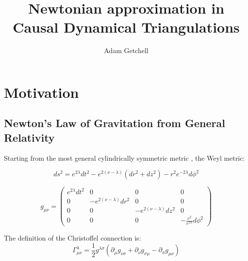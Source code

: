 \documentclass{article}
\title{Newtonian approximation in Causal Dynamical Triangulations}
\author{Adam Getchell}
\date{}
\begin{document}
\maketitle
\tableofcontents

\section{Motivation}

\subsection{Newton's Law of Gravitation from General Relativity}

Starting from the most general cylindrically symmetric metric \cite{synge_relativity}, the Weyl metric:

\begin{equation}
ds^{2}=e^{2\lambda}dt^{2}-e^{2\left(\nu-\lambda\right)}\left(dr^{2}+dz^{2}\right)-r^{2}e^{-2\lambda}d\phi^{2}
\end{equation}

\begin{equation}
g_{\mu\nu}=\left(\begin{array}{cccc}
e^{2\lambda}dt^{2} & 0 & 0 & 0\\
0 & -e^{2\left(\nu-\lambda\right)}dr^{2} & 0 & 0\\
0 & 0 & -e^{2\left(\nu-\lambda\right)}dz^{2} & 0\\
0 & 0 & 0 & -\frac{r^{2}}{e^{2\lambda}}d\phi^{2}
\end{array}\right)\label{eq:general-axisymmetric-static-matrix-metric}
\end{equation}

The definition of the Christoffel connection is: \cite{carroll2003spacetime} 
\begin{equation}
\Gamma_{\mu\nu}^{\lambda}=\frac{1}{2}g^{\lambda\sigma}\left(\partial_{\mu}g_{\nu\sigma}+\partial_{\nu}g_{\sigma\mu}-\partial_{\sigma}g_{\mu\nu}\right)
\end{equation}
\end{document}

